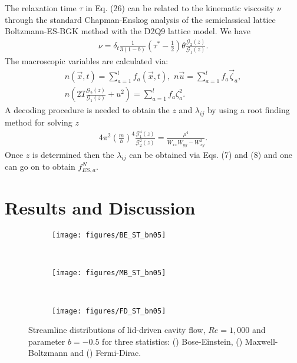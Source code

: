 \documentclass[aip,jmp,amsmath,amssymb,reprint,noshowpacs]{revtex4-1}
\begin{document}
The relaxation time $\tau$ in Eq. (26) can be related to the kinematic viscosity $\nu$ through the standard
Chapman-Enskog analysis \cite{Henon87, Qian1} of the semiclassical lattice Boltzmann-ES-BGK method with the D2Q9 lattice model.  We have
\begin{align}
 \nu =\delta_t \frac{1}{3(1-b)}( \tau^* - \frac{1}{2}) \theta \frac{\mathcal{G}_{2}(z)}{\mathcal{G}_{1}(z)}.
\end{align}
The macroscopic variables are calculated via:
\begin{align}
n(\vec x, t) = \sum_{a=1}^l  f_a(\vec x, t), \,\,
n\vec u = \sum_{a=1}^l  f_a \vec \zeta_a, \nonumber \\
 n (2 T \frac{\mathcal{G}_{2}(z)}{\mathcal{G}_{1}(z)} + u^2) = \sum_{a=1}^l f_a \zeta_a^2.
\end{align}
A decoding procedure is needed to obtain the $z$ and $\lambda_{ij}$ by using a root finding method for solving $z$
\begin{align}
4 \pi^2 \left(\frac{m}{h}\right)^4 \frac{\mathcal{G}^4_{1}(z)}{ \mathcal{G}^2_{2}(z)}= \frac{\rho^4}{W_{xx}W_{yy}-W_{xy}^2}.
\end{align}
Once $z$ is determined then the $\lambda_{ij}$ can be obtained via Eqs. (7) and (8) and one can go on to obtain $f^N_{ES,a}$.

\section{Results and Discussion}
\begin{figure*}[ht]
\centering
        \begin{subfigure}[b]{0.3\textwidth}
                \centering
                \texttt{[image: figures/BE\_ST\_bn05]}
                \caption{ }
                \label{fig:BE_Streamlines_bn05}
        \end{subfigure}%
				~
				\begin{subfigure}[b]{0.3\textwidth}
                \centering
                \texttt{[image: figures/MB\_ST\_bn05]}
                \caption{ }
                \label{fig:MB_Streamlines_bn05}
        \end{subfigure}%
				~
				\begin{subfigure}[b]{0.3\textwidth}
                \centering
                \texttt{[image: figures/FD\_ST\_bn05]}
                \caption{ }
                \label{fig:FD_Streamlines_bn05}
        \end{subfigure}%
	\caption{Streamline distributions of lid-driven cavity flow, $Re=1,000$ and parameter $b=-0.5$ for three statistics:
	() Bose-Einstein, () Maxwell-Boltzmann and
 	() Fermi-Dirac.}
	\label{fig:Streamlines_bn05}
\end{figure*}
\end{document}
